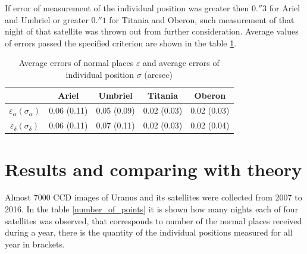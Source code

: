 \documentclass[]{article}
\begin{document}
If error of measurement of the individual position was greater then $0.''3$ for Ariel and Umbriel or greater $0.''1$ for Titania and Oberon, such measurement of that night of that satellite was thrown out from further consideration. Average values of errors passed the specified criterion are shown in the table \ref{errors}.\par
\begin{table}[h!]
\caption{Average errors of normal places $\varepsilon$ and average errors of individual position $\sigma$ (arcsec)}
\label{errors}
\begin{center}
\begin{tabular}{|c|c|c|c|c|}
\hline
&Ariel&Umbriel&Titania&Oberon \\
\hline
$\varepsilon_\alpha (\sigma_\alpha)$&0.06 (0.11)&0.05 (0.09)&0.02 (0.03)&0.02 (0.03) \\
$\varepsilon_\delta (\sigma_\delta)$&0.06 (0.11)&0.07 (0.11)&0.02 (0.03)&0.02 (0.04) \\
\hline
\end{tabular}
\end{center}
\end{table}



\section{Results and comparing with theory}
Almost 7000 CCD images of Uranus and its satellites were collected from 2007 to 2016. In the table \ref{number_of_points} it is shown how many nights each of four satellites was observed, that corresponds to number of the normal places received during a year, there is the quantity of the individual positions measured for all year in brackets.\par
\end{document}
